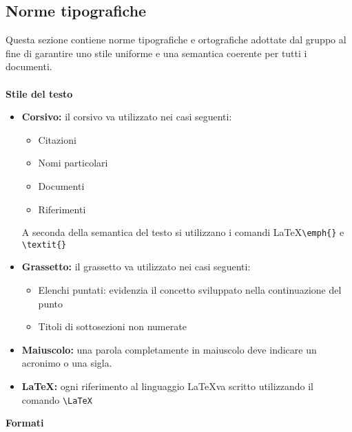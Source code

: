 \documentclass[a4paper]{report}
\begin{document}
			\subsection{Norme tipografiche}
				Questa sezione contiene norme tipografiche e ortografiche adottate dal gruppo al fine di garantire uno stile
				 uniforme e una semantica coerente per tutti i documenti.  \\ \\
				\textbf{Stile del testo} 
					\begin{itemize}
					 \item \textbf{Corsivo:} il corsivo va utilizzato nei casi seguenti:
					 \begin{itemize}
					 	\item Citazioni
					 	\item Nomi particolari
					 	\item Documenti
					 	\item Riferimenti
					 \end{itemize}
					 A seconda della semantica del testo si utilizzano i comandi \LaTeX \space \verb|\emph{}| e \verb|\textit{}|
					 \item \textbf{Grassetto:} il grassetto va utilizzato nei casi seguenti:
					 \begin{itemize}
					 	\item Elenchi puntati: evidenzia il concetto sviluppato nella continuazione del punto
					 	\item Titoli di sottosezioni non numerate
					 \end{itemize}
					 \item \textbf{Maiuscolo:} una parola completamente in maiuscolo deve indicare un acronimo o una sigla.
					 \item \textbf{\LaTeX:} ogni riferimento al linguaggio \LaTeX \space va scritto utilizzando il comando
					  \verb|\LaTeX|
					\end{itemize}
				\textbf{Formati} 
\end{document}
